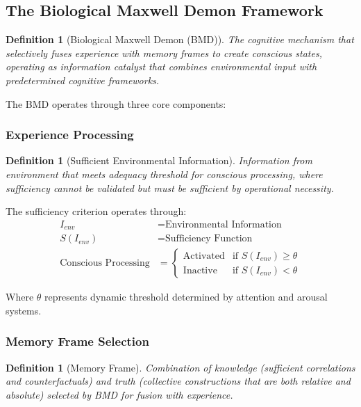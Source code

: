 \documentclass[12pt,a4paper]{article}
\newtheorem{definition}[theorem]{Definition}
\begin{document}
\subsection{The Biological Maxwell Demon Framework}

\begin{definition}[Biological Maxwell Demon (BMD)]
The cognitive mechanism that selectively fuses experience with memory frames to create conscious states, operating as information catalyst that combines environmental input with predetermined cognitive frameworks.
\end{definition}

The BMD operates through three core components:

\subsubsection{Experience Processing}
\begin{definition}[Sufficient Environmental Information]
Information from environment that meets adequacy threshold for conscious processing, where sufficiency cannot be validated but must be sufficient by operational necessity.
\end{definition}

The sufficiency criterion operates through:
\begin{align}
I_{env} &= \text{Environmental Information} \\
S(I_{env}) &= \text{Sufficiency Function} \\
\text{Conscious Processing} &= \begin{cases} 
\text{Activated} & \text{if } S(I_{env}) \geq \theta \\
\text{Inactive} & \text{if } S(I_{env}) < \theta
\end{cases}
\end{align}

Where $\theta$ represents dynamic threshold determined by attention and arousal systems.

\subsubsection{Memory Frame Selection}
\begin{definition}[Memory Frame]
Combination of knowledge (sufficient correlations and counterfactuals) and truth (collective constructions that are both relative and absolute) selected by BMD for fusion with experience.
\end{definition}
\end{document}
